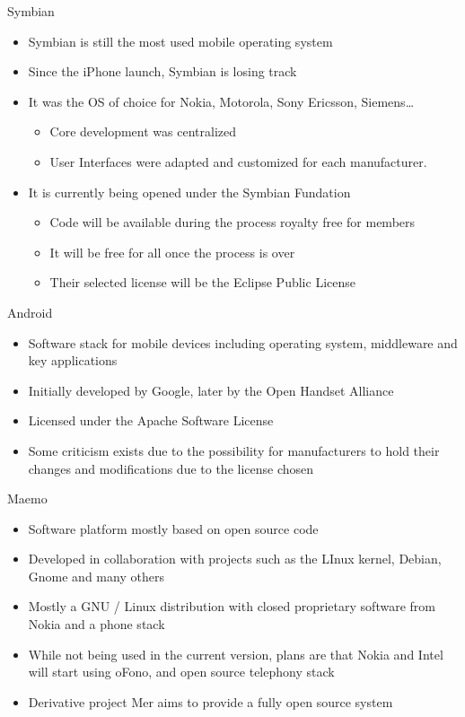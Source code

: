 \documentclass{beamer}
\begin{document}
\begin{frame}{Symbian}
\begin{itemize}
\item Symbian is still the most used mobile operating system
\item Since the iPhone launch, Symbian is losing track
\item It was the OS of choice for Nokia, Motorola, Sony Ericsson, Siemens\dots
\begin{itemize}
\item Core development was centralized
\item User Interfaces were adapted and customized for each manufacturer.
\end{itemize}
\item It is currently being opened under the Symbian Fundation
\begin{itemize}
\item Code will be available during the process royalty free for members
\item It will be free for all once the process is over
\item Their selected license will be the Eclipse Public License
\end{itemize}
\end{itemize}
\end{frame}

\begin{frame}{Android}
\begin{itemize}
\item Software stack for mobile devices including operating system, middleware and key applications
\item Initially developed by Google, later by the Open Handset Alliance
\item Licensed under the Apache Software License
\item Some criticism exists due to the possibility for manufacturers to hold their changes and modifications due to the license chosen
\end{itemize}
\end{frame}

\begin{frame}{Maemo}
\begin{itemize}
\item Software platform mostly based on open source code
\item Developed in collaboration with projects such as the LInux kernel, Debian, Gnome and many others
\item Mostly a GNU / Linux distribution with closed proprietary software from Nokia and a phone stack
\item While not being used in the current version, plans are that Nokia and Intel will start using oFono, and open source telephony stack
\item Derivative project Mer aims to provide a fully open source system
\end{itemize}
\end{frame}
\end{document}
